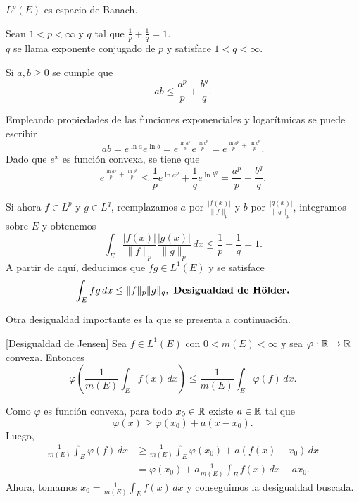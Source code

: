 \begin{ejercicio}{}
$L^p(E)$ es espacio de Banach.
\end{ejercicio}

Sean $1<p<\infty$ y $q$ tal que $\frac{1}{p}+\frac{1}{q}=1$. \\$q$ se llama exponente conjugado de $p$ y satisface  $1<q<\infty$.

\begin{lema}{}
 Si $a,b\geq 0$ se cumple que
\[ab\leq \frac{a^p}{p}+\frac{b^q}{q}.\]
\end{lema}

\begin{demo}
Empleando propiedades de las funciones exponenciales y logar\'itmicas se puede escribir
\[
ab=e^{\ln a} e^{\ln b}=e^{\frac{\ln a^p}{p}} e^{\frac{\ln b^p}{p}}=
e^{\frac{\ln a^p}{p}+\frac{\ln b^p}{p}}.
\]
Dado que $e^x$ es funci\'on convexa, se tiene que 
\[
e^{\frac{\ln a^p}{p}+\frac{\ln b^p}{p}}
\leq 
\frac{1}{p} e^{\ln a^p}+\frac{1}{q}e^{\ln b^q}=\frac{a^p}{p}+\frac{b^q}{q}.
\]
\end{demo}

Si ahora $f \in L^p$ y $g \in L^q$, reemplazamos $a$ por $\frac{|f(x)|}{\|f\|_p}$ y $b$ por $\frac{|g(x)|}{\|g\|_p}$,   
integramos sobre $E$ y obtenemos
\[
\int_E \frac{|f(x)|}{\|f\|_p} \frac{|g(x)|}{\|g\|_p} \,dx \leq \frac{1}{p}+\frac{1}{q}=1.
\]
A partir de aqu\'i, deducimos que $fg\in L^1(E)$ y se satisface 
\[
\int_E fg \,dx \leq \|f\|_p \|g\|_q, \mbox{ \textbf{Desigualdad de H\"older.}}
\]

Otra desigualdad importante es la  que se presenta a continuaci\'on.

\begin{lema}{}[Desigualdad de Jensen]
 Sea $f \in L^1(E)$ con $0<m(E)<\infty$ y sea $\varphi:\mathbb{R} \to \mathbb{R}$ convexa. Entonces
 \[
 \varphi\left( \frac{1}{m(E)}\int_E f(x)\,dx \right) \leq \frac{1}{m(E)} \int_E \varphi(f)\,dx.
 \]
 \end{lema}

\begin{demo}
Como $\varphi$ es funci\'on convexa, para todo $x_0\in \mathbb{R}$ existe $a\in \mathbb{R}$ tal que 
\[
\varphi(x)\geq \varphi(x_0)+a(x-x_0).
\]
Luego,
\[
\begin{split}
\frac{1}{m(E)} \int_E \varphi(f)\,dx &\geq 
\frac{1}{m(E)}\int_E \varphi(x_0)+a(f(x)-x_0)\,dx
\\
&=\varphi(x_0)+a\frac{1}{m(E)}\int_E f(x)\,dx -ax_0.
\end{split}
\]
Ahora, tomamos $x_0=\frac{1}{m(E)} \int_E f(x)\,dx$ y  conseguimos la desigualdad buscada.
\end{demo}

